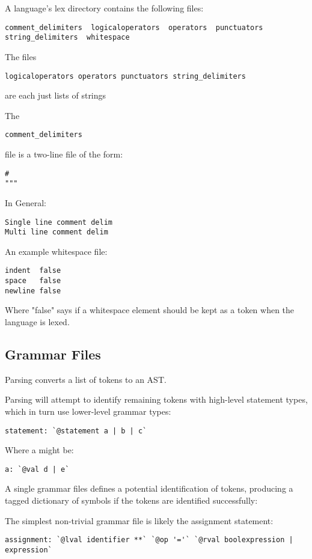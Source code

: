 \documentclass{article}
\begin{document}
A language's lex directory contains the following files:
\begin{verbatim}
comment_delimiters  logicaloperators  operators  punctuators  string_delimiters  whitespace
\end{verbatim}

The files 
\begin{verbatim}
logicaloperators operators punctuators string_delimiters
\end{verbatim}
are each just lists of strings

The 
\begin{verbatim}
comment_delimiters  
\end{verbatim}
file is a two-line file of the form:
\begin{verbatim}
#
""" 
\end{verbatim}
In General:
\begin{verbatim}
Single line comment delim
Multi line comment delim
\end{verbatim}

An example whitespace file:
\begin{verbatim}
indent  false
space   false
newline false
\end{verbatim}
Where "false" says if a whitespace element should be kept as a token when the language is lexed.

\subsection{Grammar Files}

Parsing converts a list of tokens to an AST.

Parsing will attempt to identify remaining tokens with high-level statement types, which in turn use lower-level grammar types:
\begin{verbatim}
statement: `@statement a | b | c`
\end{verbatim}
Where a might be:
\begin{verbatim}
a: `@val d | e`
\end{verbatim}

A single grammar files defines a potential identification of tokens, producing a tagged dictionary of symbols if the tokens are identified successfully:

The simplest non-trivial grammar file is likely the assignment statement:
\begin{verbatim}
assignment: `@lval identifier **` `@op '='` `@rval boolexpression | expression`
\end{verbatim}
\end{document}
